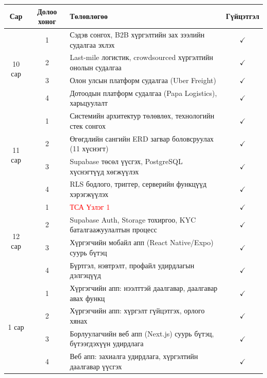 \begin{table}[h!t]
\centering
\small
\begin{tabular}{|c|c|p{7.5cm}|c|}
\hline
\textbf{Сар} & \textbf{Долоо хоног} & \textbf{Төлөвлөгөө} & \textbf{Гүйцэтгэл} \\
\hline

\multirow{4}{*}{10 сар}
& 1 & Сэдэв сонгох, B2B хүргэлтийн зах зээлийн судалгаа эхлэх & $\checkmark$ \\
\cline{2-4}
& 2 & Last-mile логистик, crowdsourced хүргэлтийн онолын судалгаа & $\checkmark$ \\
\cline{2-4}
& 3 & Олон улсын платформ судалгаа (Uber Freight) & $\checkmark$ \\
\cline{2-4}
& 4 & Дотоодын платформ судалгаа (Papa Logistics), харьцуулалт & $\checkmark$ \\
\hline

\multirow{4}{*}{11 сар}
& 1 & Системийн архитектур төлөвлөх, технологийн стек сонгох & $\checkmark$ \\
\cline{2-4}
& 2 & Өгөгдлийн сангийн ERD загвар боловсруулах (11 хүснэгт) & $\checkmark$ \\
\cline{2-4}
& 3 & Supabase төсөл үүсгэх, PostgreSQL хүснэгтүүд хөгжүүлэх & $\checkmark$ \\
\cline{2-4}
& 4 & RLS бодлого, триггер, серверийн функцүүд хэрэгжүүлэх & $\checkmark$ \\
\hline

\multirow{4}{*}{12 сар}
& 1 & \textcolor{red}{ТСА Үзлэг 1} & $\checkmark$ \\
\cline{2-4}
& 2 & Supabase Auth, Storage тохиргоо, KYC баталгаажуулалтын процесс & $\checkmark$ \\
\cline{2-4}
& 3 & Хүргэгчийн мобайл апп (React Native/Expo) суурь бүтэц & $\checkmark$ \\
\cline{2-4}
& 4 & Бүртгэл, нэвтрэлт, профайл удирдлагын дэлгэцүүд & $\checkmark$ \\
\hline

\multirow{4}{*}{1 сар}
& 1 & Хүргэгчийн апп: нээлттэй даалгавар, даалгавар авах функц & $\checkmark$ \\
\cline{2-4}
& 2 & Хүргэгчийн апп: хүргэлт гүйцэтгэх, орлого хянах & $\checkmark$ \\
\cline{2-4}
& 3 & Борлуулагчийн веб апп (Next.js) суурь бүтэц, бүтээгдэхүүн удирдлага & $\checkmark$ \\
\cline{2-4}
& 4 & Веб апп: захиалга удирдлага, хүргэлтийн даалгавар үүсгэх & $\checkmark$ \\
\hline


\end{tabular}
\end{table}
